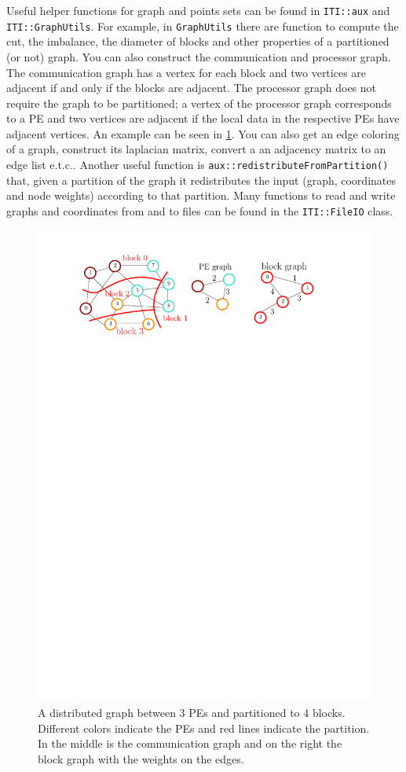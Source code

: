 \documentclass[a4paper,10pt]{article}
\newcommand{\etc}{e.t.c.}
\newcommand{\MI}[1]{\texttt{#1}}
\begin{document}
Useful helper functions for graph and points sets can be found in \MI{ITI::aux}
and \MI{ITI::GraphUtils}. For example, in \MI{GraphUtils} there are function to compute the cut,
the imbalance, the diameter of blocks and other properties of a partitioned (or not) graph.
You can also construct the communication and processor graph.
The communication graph has a vertex for each block and two vertices
are adjacent if and only if the blocks are adjacent. The processor graph does not require the graph
to be partitioned; a vertex of the processor graph corresponds to a PE and two vertices are adjacent 
if the local data in the respective PEs have adjacent vertices. An example can be seen in
\cref{fig:part_graph}. You can also get an edge coloring of a graph,
construct its laplacian matrix, convert a an adjacency matrix to an edge list \etc.
Another useful function is \MI{aux::redistributeFromPartition()} that, given a partition of the graph 
it redistributes the input (graph, coordinates and node weights) according to that partition.
Many functions to read and write graphs and coordinates from and to files can be found
in the \MI{ITI::FileIO} class.

\begin{figure}[h]
\centering
\includegraphics[scale=0.9]{graph_partitioned_with_PE_block_graph}
\caption{A distributed graph between 3 PEs and partitioned to 4 blocks. Different colors indicate the PEs
and red lines indicate the partition. In the middle is the communication graph and on the right the
block graph with the weights on the edges.}
\label{fig:part_graph}
\end{figure}
\end{document}
